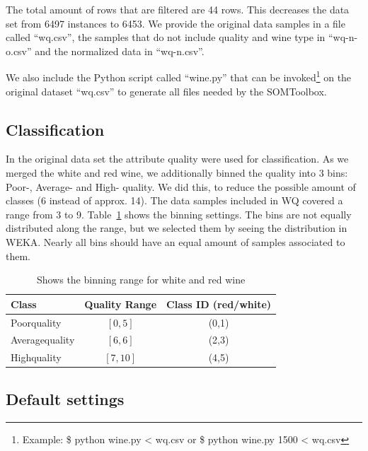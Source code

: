 \documentclass{acm_proc_article-sp}
\begin{document}
The total amount of rows that are filtered are 44 rows. This decreases the data set from 6497 instances to 6453.
We provide the original data samples in a file called ``wq.csv'', the samples that do not include quality and wine type
in ``wq-n-o.csv'' and the normalized data in ``wq-n.csv''.

We also include the Python script called ``wine.py'' that can be invoked\footnote{Example: \$ python wine.py < wq.csv or 
\$ python wine.py 1500 < wq.csv} on the original dataset ``wq.csv'' to generate all files needed by the SOMToolbox.

\subsection{Classification}

In the original data set the attribute quality were used for classification. As we merged the white and red wine,
we additionally binned the quality into 3 bins: Poor-, Average- and High- quality. We did this, to reduce the possible
amount of classes (6 instead of approx. 14).
The data samples included in WQ covered a range from 3 to 9. Table~\ref{tab:quality-binning} shows the binning settings.
The bins are not equally distributed along the range, but we selected them by seeing the distribution in WEKA. Nearly
all bins should have an equal amount of samples associated to them.

\begin{table}
\centering
\begin{tabular}{l|c|c}
    Class & Quality Range & Class ID (red/white)\\
    \hline
    \hline
    Poorquality & $[0,5]$ & (0,1) \\
    \hline
    Averagequality & $[6,6]$ & (2,3) \\
    \hline
    Highquality & $[7,10]$ & (4,5) \\
    \hline
\end{tabular}
\caption{Shows the binning range for white and red wine}
\label{tab:quality-binning}
\end{table}

\subsection{Default settings}
\end{document}
